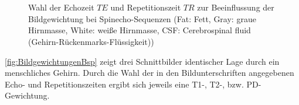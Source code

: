 \begin{figure}[H]
	\centering
	\\
	\\
	\caption[Bildgewichtung bei Spinecho-Sequenzen]{Wahl der Echozeit $TE$ und Repetitionszeit $TR$ zur Beeinflussung der Bildgewichtung bei Spinecho-Sequenzen (Fat: Fett, Gray: graue Hirnmasse, White: weiße Hirnmasse, CSF: Cerebrospinal fluid (Gehirn-Rückenmarks-Flüssigkeit)) \cite[S.~424ff]{Bushberg2011}}
	\label{fig:Bildgewichtungen}
\end{figure}

\autoref{fig:BildgewichtungenBsp} zeigt drei Schnittbilder identischer Lage durch ein menschliches Gehirn. Durch die Wahl der in den Bildunterschriften angegebenen Echo- und Repetitionszeiten ergibt sich jeweils eine T1-, T2-, bzw. PD-Gewichtung. 

